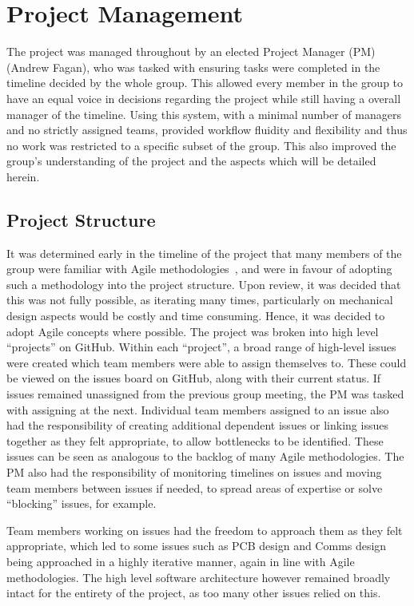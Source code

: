\chapter{Project Management}\label{pm}

The project was managed throughout by an elected Project Manager (PM)
(Andrew Fagan), who was tasked with ensuring tasks were
completed in the timeline decided by the whole group. This
allowed every member in the group to have an equal voice in
decisions regarding the project while still having a overall
manager of the timeline. Using this system, with a minimal
number of managers and no strictly assigned teams, provided
workflow fluidity and flexibility and thus no work was restricted
to a specific subset of the group. This also improved the
group's understanding of the project and the aspects
which will be detailed herein.

\section{Project Structure}\label{pm/structure}

It was determined early in the timeline of the project that many members of the
group were familiar with Agile methodologies~\cite{agilemeth}, and were in favour of
adopting such a methodology into the project structure. Upon review, it was
decided that this was not fully possible, as iterating many times, particularly on
mechanical design aspects would be costly and time consuming. Hence, it was
decided to adopt Agile concepts where possible. The project was broken into high
level ``projects'' on GitHub. Within each ``project'', a broad range of high-level
issues were created which team members were able to assign themselves to. These could 
be viewed on the issues board on GitHub, along with their current status. If
issues remained unassigned from the previous group meeting, the PM was tasked with
assigning at the next. Individual team members assigned to an issue also had the
responsibility of creating additional dependent issues or linking issues together
as they felt appropriate, to allow bottlenecks to be identified. These issues can
be seen as analogous to the backlog of many Agile methodologies. The PM also had
the responsibility of monitoring timelines on issues and moving team members
between issues if needed, to spread areas of expertise or solve ``blocking''
issues, for example.

Team members working on issues had the freedom to approach them as they felt
appropriate, which led to some issues such as PCB design and Comms design being
approached in a highly iterative manner, again in line with Agile methodologies.
The high level software architecture however remained broadly intact for the
entirety of the project, as too many other issues relied on this.

